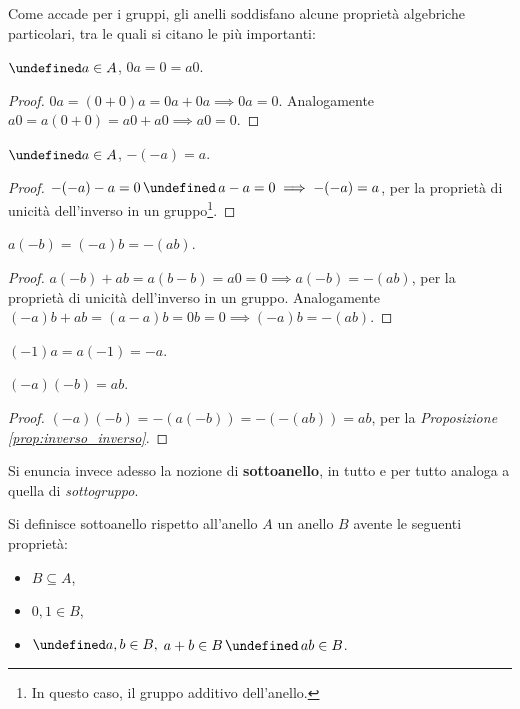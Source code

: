 \documentclass[a4paper]{article}
\let\oldforall\forall
\let\forall\undefined
\DeclareMathOperator{\forall}{\oldforall}
\let\oldland\land
\let\land\undefined
\DeclareMathOperator{\land}{\oldland}
\begin{document}
Come accade per i gruppi, gli anelli soddisfano alcune proprietà algebriche
particolari, tra le quali si citano le più importanti:

\begin{proposition}
    $\forall a \in A$, $0a=0=a0$.
\end{proposition}

\begin{proof}
    $0a=(0+0)a=0a+0a \implies 0a=0$. Analogamente $a0=a(0+0)=a0+a0 \implies a0=0$.
\end{proof}

\begin{proposition}
    $\forall a \in A$, $-(-a)=a$.
\end{proposition}

\begin{proof}
    $-(-a)-a=0 \,\land\, a-a=0 \implies -(-a)=a$, per la proprietà di unicità
    dell'inverso in un gruppo\footnote{In questo caso, il gruppo additivo dell'anello.}.
\end{proof}

\begin{proposition}
    \label{prop:inverso_inverso}
    $a(-b)=(-a)b=-(ab)$.
\end{proposition}

\begin{proof}
    $a(-b)+ab=a(b-b)=a0=0 \implies a(-b)=-(ab)$, per la proprietà di unicità dell'inverso in un gruppo. Analogamente $(-a)b+ab=(a-a)b=0b=0 \implies
        (-a)b=-(ab)$.
\end{proof}

\begin{corollary}
    $(-1)a=a(-1)=-a$.
\end{corollary}

\begin{proposition}
    $(-a)(-b)=ab$.
\end{proposition}

\begin{proof}
    $(-a)(-b)=-(a(-b))=-(-(ab))=ab$, per la \textit{Proposizione \ref{prop:inverso_inverso}}.
\end{proof}

Si enuncia invece adesso la nozione di \textbf{sottoanello}, in tutto e per
tutto analoga a quella di \textit{sottogruppo}.

\begin{definition}
    Si definisce sottoanello rispetto all'anello $A$ un anello $B$ avente le
    seguenti proprietà:

    \begin{itemize}
        \item $B \subseteq A$,
        \item $0, 1 \in B$,
        \item $\forall a, b \in B,$ $a + b \in B \,\land\, ab \in B$.
    \end{itemize}
\end{definition}
\end{document}
